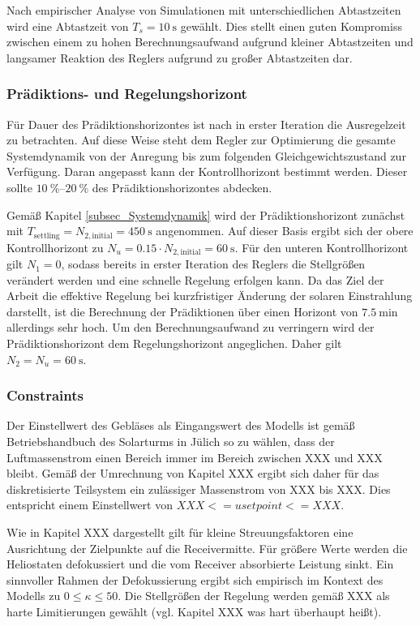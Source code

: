 Nach empirischer Analyse von Simulationen mit unterschiedlichen Abtastzeiten wird eine Abtastzeit von $T_s=\SI{10}{\second}$ gewählt.
Dies stellt einen guten Kompromiss zwischen einem zu hohen Berechnungsaufwand aufgrund kleiner Abtastzeiten und langsamer Reaktion des Reglers aufgrund zu großer Abtastzeiten dar.


\subsubsection*{Prädiktions- und Regelungshorizont} \label{subsubsec_horizonte}
Für Dauer des Prädiktionshorizontes ist nach \cite{XXX} in erster Iteration die Ausregelzeit zu betrachten.
Auf diese Weise steht dem Regler zur Optimierung die gesamte Systemdynamik von der Anregung bis zum folgenden Gleichgewichtszustand zur Verfügung.
Daran angepasst kann der Kontrollhorizont bestimmt werden.
Dieser sollte $\SIrange{10}{20}{\percent}$ des Prädiktionshorizontes abdecken.

Gemäß Kapitel \ref{subsec_Systemdynamik} wird der Prädiktionshorizont zunächst mit $T_{\mathrm{settling}} = N_{2,\mathrm{initial}} = \SI{450}{\second}$ angenommen.
Auf dieser Basis ergibt sich der obere Kontrollhorizont zu $N_u = 0.15\cdot N_{2,\mathrm{initial}} = \SI{60}{\second}$.
Für den unteren Kontrollhorizont gilt $N_1 = 0$, sodass bereits in erster Iteration des Reglers die Stellgrößen verändert werden und eine schnelle Regelung erfolgen kann.
Da das Ziel der Arbeit die effektive Regelung bei kurzfristiger Änderung der solaren Einstrahlung darstellt, ist die Berechnung der Prädiktionen über einen Horizont von $\SI{7.5}{\minute}$ allerdings sehr hoch.
Um den Berechnungsaufwand zu verringern wird der Prädiktionshorizont dem Regelungshorizont angeglichen.
Daher gilt $N_2 = N_u = \SI{60}{\second}$.

\subsubsection*{Constraints} \label{subsubsec_constraints}
Der Einstellwert des Gebläses als Eingangswert des Modells ist gemäß Betriebshandbuch des Solarturms in Jülich so zu wählen, dass der Luftmassenstrom einen Bereich immer im Bereich zwischen XXX und XXX bleibt.
Gemäß der Umrechnung von Kapitel XXX ergibt sich daher für das diskretisierte Teilsystem ein zulässiger Massenstrom von XXX bis XXX.
Dies entspricht einem Einstellwert von $XXX <= usetpoint <= XXX$.

Wie in Kapitel XXX dargestellt gilt für kleine Streuungsfaktoren eine Ausrichtung der Zielpunkte auf die Receivermitte.
Für größere Werte werden die Heliostaten defokussiert und die vom Receiver absorbierte Leistung sinkt.
Ein sinnvoller Rahmen der Defokussierung ergibt sich empirisch im Kontext des Modells zu $0 \leq \kappa \leq 50$.
Die Stellgrößen der Regelung werden gemäß XXX als harte Limitierungen gewählt (vgl. Kapitel XXX was hart überhaupt heißt).

